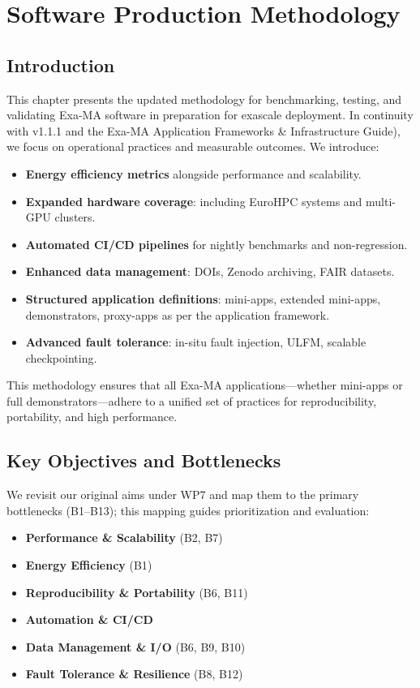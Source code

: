 
\chapter{Software Production Methodology}
\label{chap:methodology}

\section{Introduction}
This chapter presents the updated methodology for benchmarking, testing, and validating Exa-MA software in preparation for exascale deployment. In continuity with v1.1.1 and the Exa-MA Application Frameworks \& Infrastructure Guide), we focus on operational practices and measurable outcomes. We introduce:

\begin{itemize}
  \item \textbf{Energy efficiency metrics} alongside performance and scalability.
  \item \textbf{Expanded hardware coverage}: including EuroHPC systems and multi-GPU clusters.
  \item \textbf{Automated CI/CD pipelines} for nightly benchmarks and non-regression.
  \item \textbf{Enhanced data management}: DOIs, Zenodo archiving, FAIR datasets.
  \item \textbf{Structured application definitions}: mini-apps, extended mini-apps, demonstrators, proxy-apps as per the application framework.
  \item \textbf{Advanced fault tolerance}: in-situ fault injection, ULFM, scalable checkpointing.
\end{itemize}

This methodology ensures that all Exa-MA applications—whether mini-apps or full demonstrators—adhere to a unified set of practices for reproducibility, portability, and high performance.

\section{Key Objectives and Bottlenecks}
We revisit our original aims under WP7 and map them to the primary bottlenecks (B1--B13); this mapping guides prioritization and evaluation:

\begin{itemize}
  \item \textbf{Performance \& Scalability} (\ac{B2}, \ac{B7})
  \item \textbf{Energy Efficiency} (\ac{B1})
  \item \textbf{Reproducibility \& Portability} (\ac{B6}, \ac{B11})
  \item \textbf{Automation \& CI/CD}
  \item \textbf{Data Management \& I/O} (\ac{B6}, \ac{B9}, \ac{B10})
  \item \textbf{Fault Tolerance \& Resilience} (\ac{B8}, \ac{B12})
\end{itemize}

